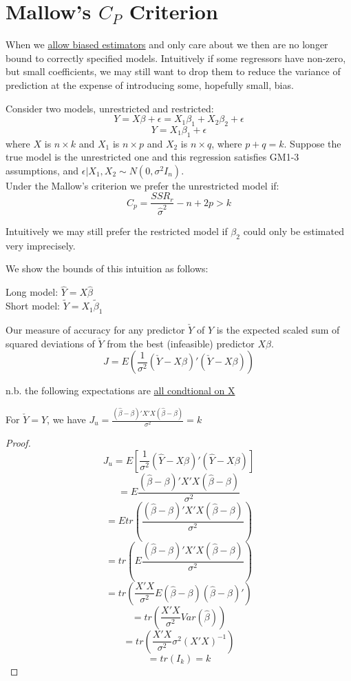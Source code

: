 \documentclass[DIV=14,titlepage=false]{scrreprt}
\begin{document}
\section{Mallow's \(C_P\) Criterion}

When we \underline{allow biased estimators} and only care about \underline{} we then are no longer bound to correctly specified models.
Intuitively if some regressors have non-zero, but small coefficients, we may still want to drop them to reduce the variance of prediction at the expense of introducing some, hopefully small, bias.

\begin{prop}
    Consider two models, unrestricted and restricted:
    \[Y=X\beta+\epsilon = X_1\beta_1+X_2\beta_2+\epsilon\]
    \[Y=X_1\beta_1+\epsilon\]
    where \(X\) is \(n\times k\) and \(X_1\) is \(n\times p\) and \(X_2\) is \(n\times q\), where \(p+q=k\).
    Suppose the true model is the unrestricted one and this regression satisfies GM1-3 assumptions, and \(\epsilon|X_1,X_2 \sim N(0, \sigma^2I_n)\).
\\ Under the Mallow's criterion we prefer the unrestricted model if:
\[C_p=\frac{SSR_r}{\hat{\sigma}^2} -n + 2p > k\]
\end{prop}

Intuitively we may still prefer the restricted model if \(\beta_2\) could only be estimated very imprecisely.

    We show the bounds of this intuition as follows:

    Long model: \(\hat{Y}=X\hat{\beta}\)
    \\ Short model: \(\tilde{Y}=X_1\tilde{\beta}_1\)

    Our measure of accuracy for any predictor \(\check{Y}\) of \(Y\) is the expected scaled sum of squared deviations of \(\check{Y}\) from the best (infeasible) predictor \(X\beta\).
    \[J=E\left(\frac{1}{\sigma^2}(\check{Y}-X\beta)'(\check{Y}-X\beta)\right)\]

n.b. the following expectations are \underline{all condtional on X}
\vspace{5mm}

\begin{lemma}
    For \(\check{Y}=\hat{Y}\), we have \(J_u = \frac{(\hat{\beta}-\beta)'X'X(\hat{\beta}-\beta)}{\sigma^2}=k\)
\end{lemma}

\vspace{5mm}

\begin{proof}
    \[J_u=E\left[\frac{1}{\sigma^2}(\hat{Y}-X\beta)'(\hat{Y}-X\beta)\right]\]
    \[=E\frac{(\hat{\beta}-\beta)'X'X(\hat{\beta}-\beta)}{\sigma^2}\]
    \[=Etr(\frac{(\hat{\beta}-\beta)'X'X(\hat{\beta}-\beta)}{\sigma^2})\]
    \[=tr(E\frac{(\hat{\beta}-\beta)'X'X(\hat{\beta}-\beta)}{\sigma^2})\]
    \[=tr(\frac{X'X}{\sigma^2}E(\hat{\beta}-\beta)(\hat{\beta}-\beta)')\]
    \[=tr(\frac{X'X}{\sigma^2}Var(\hat{\beta}))\]
    \[=tr(\frac{X'X}{\sigma^2}\sigma^2(X'X)^{-1})\]
    \[=tr(I_k)=k\]
\end{proof}
\end{document}
